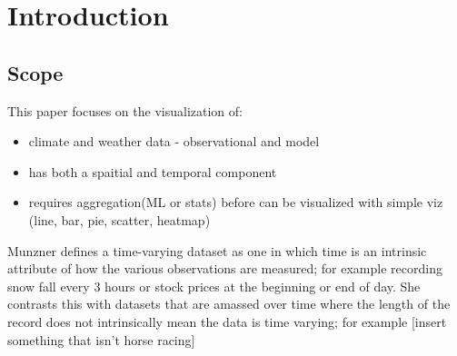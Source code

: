\documentclass[letterpaper,onecolumn,titlepage]{Ythesis}
\title{}
\author{Machine Learning Influenced of High Dimensional Time Varying Data}
\begin{document}
\makefrontmatter

\section{Introduction}


\subsection{Scope}

This paper focuses on the visualization of:
\begin{itemize}
\item climate and weather data - observational and model
\item has both a spaitial and temporal component
\item requires aggregation(ML or stats) before can be visualized with simple viz (line, bar, pie, scatter, heatmap)
\end{itemize}





Munzner \cite{Munzner14} defines a time-varying dataset as one in which time is an intrinsic attribute of how the various observations are measured; for example recording snow fall every 3 hours or stock prices at the beginning or end of day. She contrasts this with datasets that are amassed over time where the length of the record does not intrinsically mean the data is time varying; for example [insert something that isn't horse racing] 
\end{document}
